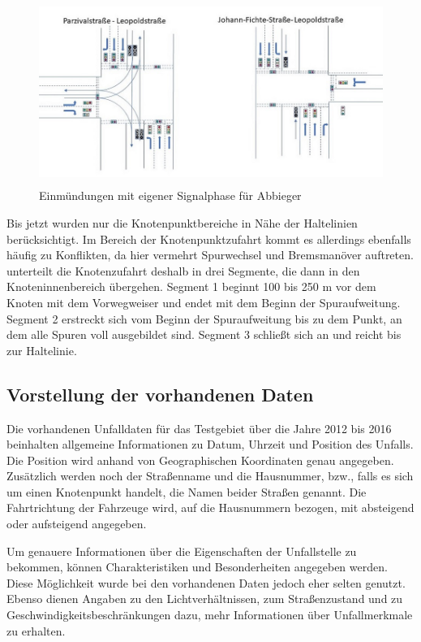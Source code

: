 \begin{savenotes}
	\begin{figure}[H]
		\centering
		\includegraphics[width=12cm,height=6cm]{figures/Einmuendungen_eigene_Phase}
		\caption[Einmündungen mit eigener Signalphase für Abbieger]{Einmündungen mit eigener Signalphase für Abbieger \parencite{Kutsch.05.04.2018}}\label{fig:Einmüngungen_eigene_Phase}
	\end{figure}
\end{savenotes}

Bis jetzt wurden nur die Knotenpunktbereiche in Nähe der Haltelinien berücksichtigt. Im Bereich der Knotenpunktzufahrt kommt es allerdings ebenfalls häufig zu Konflikten, da hier vermehrt Spurwechsel und Bremsmanöver auftreten. \Textcite[S. 19]{Erke.1978} unterteilt die Knotenzufahrt deshalb in drei Segmente, die dann in den Knoteninnenbereich übergehen. Segment 1 beginnt 100 bis 250 m vor dem Knoten mit dem Vorwegweiser und endet mit dem Beginn der Spuraufweitung. Segment 2 erstreckt sich vom Beginn der Spuraufweitung bis zu dem Punkt, an dem alle Spuren voll ausgebildet sind. Segment 3 schließt sich an und reicht bis zur Haltelinie.

\subsection{Vorstellung der vorhandenen Daten}
Die vorhandenen Unfalldaten für das Testgebiet über die Jahre 2012 bis 2016 beinhalten allgemeine Informationen zu Datum, Uhrzeit und Position des Unfalls. Die Position wird anhand von Geographischen Koordinaten genau angegeben. Zusätzlich werden noch der Straßenname und die Hausnummer, bzw., falls es sich um einen Knotenpunkt handelt, die Namen beider Straßen genannt. Die Fahrtrichtung der Fahrzeuge wird, auf die Hausnummern bezogen, mit absteigend oder aufsteigend angegeben.

Um genauere Informationen über die Eigenschaften der Unfallstelle zu bekommen, können Charakteristiken und Besonderheiten angegeben werden. Diese Möglichkeit wurde bei den vorhandenen Daten jedoch eher selten genutzt. Ebenso dienen Angaben zu den Lichtverhältnissen, zum Straßenzustand und zu Geschwindigkeitsbeschränkungen dazu, mehr Informationen über Unfallmerkmale zu erhalten.

